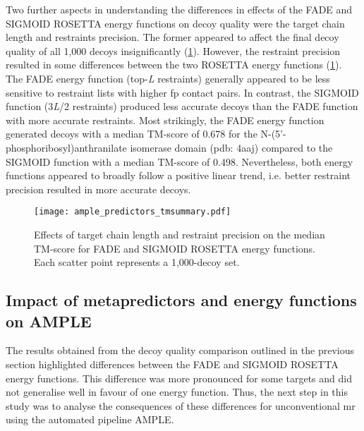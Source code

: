 Two further aspects in understanding the differences in effects of the FADE and SIGMOID ROSETTA energy functions on decoy quality were the target chain length and restraints precision. The former appeared to affect the final decoy quality of all 1,000 decoys insignificantly (\cref{fig:ample_predictor_tmsummary}). However, the restraint precision resulted in some differences between the two ROSETTA energy functions (\cref{fig:ample_predictor_tmsummary}). The FADE energy function (top-\textit{L} restraints) generally appeared to be less sensitive to restraint lists with higher \gls{fp} contact pairs.  In contrast, the SIGMOID function  (3\textit{L}/2 restraints) produced less accurate decoys than the FADE function with more accurate restraints. Most strikingly, the FADE energy function generated decoys with a median TM-score of 0.678 for the N-(5'-phosphoribosyl)anthranilate isomerase domain (\gls{pdb}: 4aaj) compared to the SIGMOID function with a median TM-score of 0.498. Nevertheless, both energy functions appeared to broadly follow a positive linear trend, i.e. better restraint precision resulted in more accurate decoys.

\begin{figure}[H]
    \centering
    \texttt{[image: ample\_predictors\_tmsummary.pdf]}
    \caption[Influence of target chain length and restraint precision on TM-score]{Effects of target chain length and restraint precision on the median TM-score for FADE and SIGMOID ROSETTA energy functions. Each scatter point represents a 1,000-decoy set.}
    \label{fig:ample_predictor_tmsummary}
\end{figure}

\subsection{Impact of metapredictors and energy functions on AMPLE}
The results obtained from the decoy quality comparison outlined in the previous section highlighted differences between the FADE and SIGMOID ROSETTA energy functions. This difference was more pronounced for some targets and did not generalise well in favour of one energy function. Thus, the next step in this study was to analyse the consequences  of these differences for unconventional \gls{mr} using the automated pipeline AMPLE.

